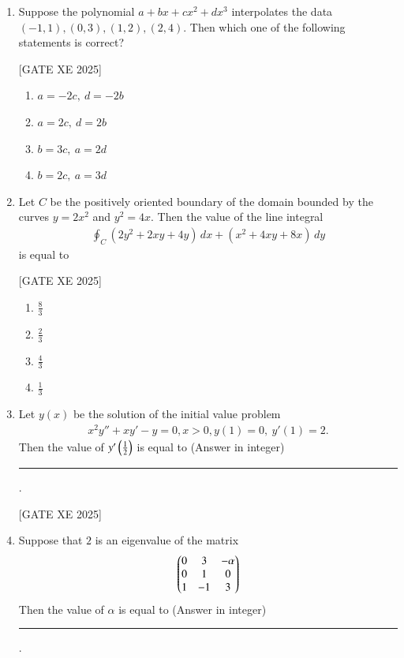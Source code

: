 \documentclass[journal,12pt,onecolumn]{IEEEtran}
\theoremstyle{remark}
\begin{document}
\begin{enumerate}
\item Suppose the polynomial $a+bx+cx^2+dx^3$ interpolates the data $(-1,1), (0,3), (1,2), (2,4)$.  
Then which one of the following statements is correct?

\hfill [GATE XE 2025]

\begin{multicols}{2}
\begin{enumerate}
\item $a=-2c,\ d=-2b$
\item $a=2c,\ d=2b$
\item $b=3c,\ a=2d$
\item $b=2c,\ a=3d$
\end{enumerate}
\end{multicols}

\item Let $C$ be the positively oriented boundary of the domain bounded by the curves $y=2x^2$ and $y^2=4x$.  
Then the value of the line integral  
\begin{align}
    \oint_C (2y^2+2xy+4y)\,dx + (x^2+4xy+8x)\,dy
\end{align} 
is equal to

\hfill [GATE XE 2025]

\begin{multicols}{2}
\begin{enumerate}
\item $\tfrac{8}{3}$
\item $\tfrac{2}{3}$
\item $\tfrac{4}{3}$
\item $\tfrac{1}{3}$
\end{enumerate}
\end{multicols}

\item Let $y(x)$ be the solution of the initial value problem  
\begin{align}
    x^2y''+xy'-y=0, x>0, y(1)=0,\ y'(1)=2.
\end{align}
Then the value of $y'\left(\tfrac{1}{2}\right)$ is equal to (Answer in integer) \rule{3cm}{0.15mm}.

\hfill [GATE XE 2025]

\item Suppose that $2$ is an eigenvalue of the matrix  
\begin{align}
    \begin{pmatrix}0 & 3 & -\alpha \\ 0 & 1 & 0 \\ 1 & -1 & 3\end{pmatrix}
\end{align}  
Then the value of $\alpha$ is equal to (Answer in integer) \rule{3cm}{0.15mm}.


\end{enumerate}
\end{document}
